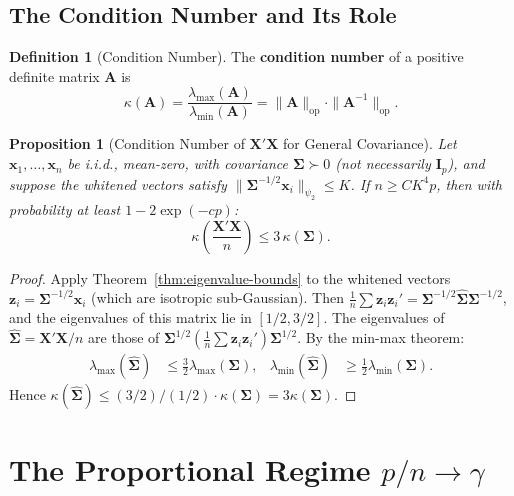 \documentclass[14pt]{extarticle}
\theoremstyle{plain}
\newtheorem{proposition}[theorem]{Proposition}
\theoremstyle{definition}
\newtheorem{definition}{Definition}[section]
\theoremstyle{remark}
\newcommand{\bX}{\mathbf{X}}
\newcommand{\bx}{\mathbf{x}}
\newcommand{\bI}{\mathbf{I}}
\newcommand{\bz}{\mathbf{z}}
\newcommand{\bA}{\mathbf{A}}
\newcommand{\bSigma}{\boldsymbol{\Sigma}}
\newcommand{\hbSigma}{\hat{\boldsymbol{\Sigma}}}
\newcommand{\opnorm}[1]{\|#1\|_{\mathrm{op}}}
\begin{document}
\subsection{The Condition Number and Its Role}

\begin{definition}[Condition Number]\label{def:condition-number}
The \textbf{condition number} of a positive definite matrix $\bA$ is
\begin{equation}\label{eq:condition-number}
\kappa(\bA) = \frac{\lambda_{\max}(\bA)}{\lambda_{\min}(\bA)} = \opnorm{\bA}\cdot\opnorm{\bA^{-1}}.
\end{equation}
\end{definition}

\begin{proposition}[Condition Number of $\bX'\bX$ for General Covariance]\label{prop:kappa-general}
Let $\bx_1, \ldots, \bx_n$ be i.i.d., mean-zero, with covariance $\bSigma \succ 0$ (not necessarily $\bI_p$), and suppose the whitened vectors satisfy $\|\bSigma^{-1/2}\bx_i\|_{\psi_2} \leqslant K$. If $n \geqslant CK^4 p$, then with probability at least $1 - 2\exp(-cp)$:
\begin{equation}\label{eq:kappa-general}
\kappa\!\left(\frac{\bX'\bX}{n}\right) \leqslant 3\,\kappa(\bSigma).
\end{equation}
\end{proposition}

\begin{proof}
Apply Theorem~\ref{thm:eigenvalue-bounds} to the whitened vectors $\bz_i = \bSigma^{-1/2}\bx_i$ (which are isotropic sub-Gaussian). Then $\frac{1}{n}\sum \bz_i\bz_i' = \bSigma^{-1/2}\hbSigma\bSigma^{-1/2}$, and the eigenvalues of this matrix lie in $[1/2, 3/2]$. The eigenvalues of $\hbSigma = \bX'\bX/n$ are those of $\bSigma^{1/2}(\frac{1}{n}\sum\bz_i\bz_i')\bSigma^{1/2}$. By the min-max theorem:
\begin{align*}
\lambda_{\max}(\hbSigma) &\leqslant \frac{3}{2}\lambda_{\max}(\bSigma), &
\lambda_{\min}(\hbSigma) &\geqslant \frac{1}{2}\lambda_{\min}(\bSigma).
\end{align*}
Hence $\kappa(\hbSigma) \leqslant (3/2)/(1/2) \cdot \kappa(\bSigma) = 3\kappa(\bSigma)$.
\end{proof}

\section{The Proportional Regime $p/n \to \gamma$}\label{sec:proportional}
\end{document}
